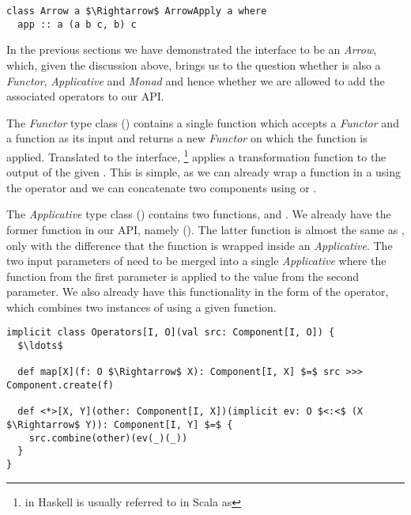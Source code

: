 \begin{lstlisting}[style=HaskellStyle, caption={\textit{ArrowApply} type class}, label={lst:arrow-apply}, captionpos=b, numbers=none]
class Arrow a $\Rightarrow$ ArrowApply a where
  app :: a (a b c, b) c
\end{lstlisting}

In the previous sections we have demonstrated the \comp interface to be an \textit{Arrow}, which, given the discussion above, brings us to the question whether \comp is also a \textit{Functor}, \textit{Applicative} and \textit{Monad} and hence whether we are allowed to add the associated operators to our API.

The \textit{Functor} type class () contains a single function  which accepts a \textit{Functor} and a function as its input and returns a new \textit{Functor} on which the function is applied. Translated to the \comp interface, \footnote{ in Haskell is usually referred to in Scala as } applies a transformation function to the output of the given \comp. This is simple, as we can already wrap a function in a \comp using the  operator and we can concatenate two components using  or \code{(>>>)}.

The \textit{Applicative} type class () contains two functions,  and \code{(<*>)}. We already have the former function in our API, namely  (). The latter function is almost the same as , only with the difference that the function is wrapped inside an \textit{Applicative}. The two input parameters of \code{(<*>)} need to be merged into a single \textit{Applicative} where the function from the first parameter is applied to the value from the second parameter. We also already have this functionality in the form of the  operator, which combines two instances of \comp using a given function.

\begin{lstlisting}[style=ScalaStyle, caption={\textit{Functor} and \textit{Applicative} operators}, label={lst:functor-and-applicative}]
implicit class Operators[I, O](val src: Component[I, O]) {
  $\ldots$

  def map[X](f: O $\Rightarrow$ X): Component[I, X] $=$ src >>> Component.create(f)
  
  def <*>[X, Y](other: Component[I, X])(implicit ev: O $<:<$ (X $\Rightarrow$ Y)): Component[I, Y] $=$ {
    src.combine(other)(ev(_)(_))
  }
}
\end{lstlisting}

